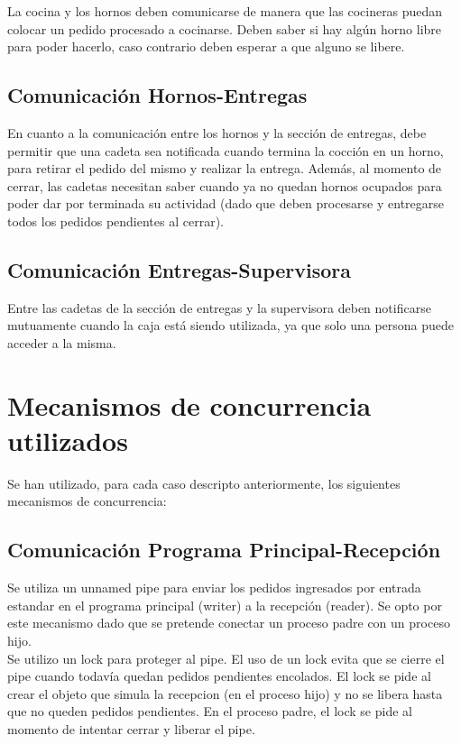 \documentclass[11pt,spanish,a4paper,openany,notitlepage]{article}
\begin{document}
La cocina y los hornos deben comunicarse de manera que las cocineras puedan colocar un pedido 
procesado a cocinarse. Deben saber si hay algún horno libre para poder hacerlo, caso contrario 
deben esperar a que alguno se libere.

\subsection{Comunicación Hornos-Entregas}

En cuanto a la comunicación entre los hornos y la sección de entregas, debe permitir que una cadeta 
sea notificada cuando termina la cocción en un horno, para retirar el pedido del mismo y realizar 
la entrega. Además, al momento de cerrar, las cadetas necesitan saber cuando ya no quedan hornos 
ocupados para poder dar por terminada su actividad (dado que deben procesarse y entregarse todos 
los pedidos pendientes al cerrar).

\subsection{Comunicación Entregas-Supervisora}

Entre las cadetas de la sección de entregas y la supervisora deben notificarse mutuamente cuando la 
caja está siendo utilizada, ya que solo una persona puede acceder a la misma. 

\section{Mecanismos de concurrencia utilizados}

Se han utilizado, para cada caso descripto anteriormente, los siguientes mecanismos de concurrencia:

\subsection{Comunicación Programa Principal-Recepción}

Se utiliza un unnamed pipe para enviar los pedidos ingresados por entrada estandar en el programa 
principal (writer) a la recepción (reader). Se opto por este mecanismo dado que se pretende conectar un proceso padre con un proceso hijo.\\ 
Se utilizo un lock para proteger al pipe. El uso de un lock evita que se cierre el pipe cuando todavía quedan pedidos pendientes encolados. El lock se pide al
crear el objeto que simula la recepcion (en el proceso hijo) y no se libera hasta que no queden pedidos pendientes. En el proceso padre, el lock se pide al momento de intentar cerrar y liberar el pipe.
\end{document}
